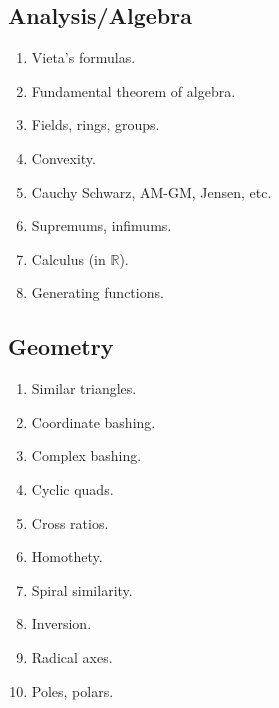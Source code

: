 \documentclass{article}
\begin{document}
\subsection*{Analysis/Algebra}
\begin{enumerate}
\item[\underline{\hspace{0.4cm}}] Vieta's formulas.
\item[\underline{\hspace{0.4cm}}] Fundamental theorem of algebra.
\item[\underline{\hspace{0.4cm}}] Fields, rings, groups. 
\item[\underline{\hspace{0.4cm}}] Convexity.
\item[\underline{\hspace{0.4cm}}] Cauchy Schwarz, AM-GM, Jensen, etc.
\item[\underline{\hspace{0.4cm}}] Supremums, infimums.
\item[\underline{\hspace{0.4cm}}] Calculus (in $\mathbb{R}$).
\item[\underline{\hspace{0.4cm}}] Generating functions.
\end{enumerate}

\subsection*{Geometry}
\begin{enumerate}
\item[\underline{\hspace{0.4cm}}] Similar triangles.
\item[\underline{\hspace{0.4cm}}] Coordinate bashing.
\item[\underline{\hspace{0.4cm}}] Complex bashing.
\item[\underline{\hspace{0.4cm}}] Cyclic quads. 
\item[\underline{\hspace{0.4cm}}] Cross ratios.
\item[\underline{\hspace{0.4cm}}] Homothety.
\item[\underline{\hspace{0.4cm}}] Spiral similarity.
\item[\underline{\hspace{0.4cm}}] Inversion.
\item[\underline{\hspace{0.4cm}}] Radical axes.
\item[\underline{\hspace{0.4cm}}] Poles, polars.
\end{enumerate}
\end{document}
